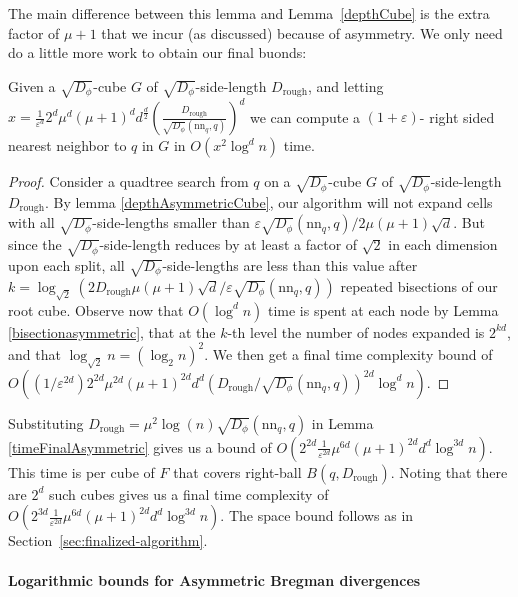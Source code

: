 \documentclass[11pt]{myclass}
\newcommand{\breg}{\ensuremath{D_\phi}}
\newcommand{\eps}{\varepsilon}
\begin{document}
The main difference between this lemma and Lemma~\ref{depthCube} is the extra factor of $\mu+1$ that we incur 
(as discussed) because of asymmetry. We only need do a little more work to obtain our final buonds:
\begin{lemma}\label{timeFinalAsymmetric}
Given a $\sqrt{\breg}$-cube $G$ of $\sqrt{\breg}$-side-length $D_{\text{rough}}$, and letting $x=  \frac{1}{\eps^d} 2^d \mu^d (\mu+1)^d d^{\frac{d}{2}} \left( \frac{D_{\text{rough}}}{\sqrt{\breg}(\text{nn}_q,q)} \right)^d $  we can compute a $(1 + \eps)$- right sided nearest neighbor to $q$ in $G$ 
in $O(x^2 \log^d n)$ time.
\end{lemma}

\begin{proof}
Consider a quadtree search from $q$ on a $\sqrt{\breg}$-cube $G$ of $\sqrt{\breg}$-side-length $D_{\text{rough}}$. By lemma \ref{depthAsymmetricCube},
 our algorithm will not expand cells with all $\sqrt{\breg}$-side-lengths smaller than  $\eps  \sqrt{\breg}( \text{nn}_q,q) / 2 \mu (\mu+1) \sqrt{d}$.
 But since the $\sqrt{\breg}$-side-length reduces by at least a factor of $\sqrt{2}$ in each dimension upon each split, 
all $\sqrt{\breg}$-side-lengths are less than this value after  $k = \log_{\sqrt{2}} \left( 2D_{\text{rough}}  \mu (\mu+1) \sqrt{d}/ \eps  \sqrt{\breg}(\text{nn}_q,q) \right)$ repeated bisections of our root cube. Observe now that $O(\log^d n)$ time is spent at each node by Lemma \ref{bisectionasymmetric}, that at the $k$-th level the 
number of nodes expanded is $2^{kd}$, and that $\log_{\sqrt{2}} n = (\log_{2} n )^2$.
We then get a final time complexity bound of 
$O\left( (1/\eps^{2d}) 2^{2d} \mu^{2d} (\mu+1)^{2d} d^d \left( D_{\text{rough}}/\sqrt{\breg}( \text{nn}_q, q) \right)^{2d} \log^d n \right)$. 
\qedhere
\end{proof}

Substituting $D_{\text{rough}} = \mu^2 \log (n) \sqrt{\breg}( \text{nn}_q,q) $ in Lemma \ref{timeFinalAsymmetric} gives us a  bound of $O\left(2^{2d} \frac{1}{\eps^{2d}}  \mu^{6d} (\mu+1)^{2d} d^d \log^{3d} n\right)$.  This time is per cube of $F$ that covers right-ball $B(q,D_{\text{rough}})$. Noting that there are $2^d$ such cubes gives us a final time complexity of $O\left(2^{3d}   \frac{1}{\eps^{2d}} \mu^{6d} (\mu+1)^{2d} d^d \log^{3d} n \right)$. The space bound follows as in Section~\ref{sec:finalized-algorithm}. 


\paragraph{Logarithmic bounds for Asymmetric Bregman divergences}
\label{subsec:assymcondition}
\end{document}
